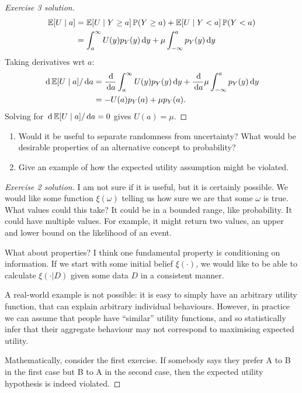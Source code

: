 \documentclass[twoside,a4paper]{article}
\begin{document}
\begin{proof}[Exercise 3 solution]
\begin{align*}
    \mathop{\mbox{\ensuremath{\mathbb{E}}}}\nolimits[U \mid a]
    &=
      \mathop{\mbox{\ensuremath{\mathbb{E}}}}\nolimits[U \mid Y \geq a] \mathop{\mbox{\ensuremath{\mathbb{P}}}}\nolimits(Y \geq a)
      +
      \mathop{\mbox{\ensuremath{\mathbb{E}}}}\nolimits[U \mid Y < a] \mathop{\mbox{\ensuremath{\mathbb{P}}}}\nolimits(Y < a)
    \\
    &=
      \int_{a}^\infty U(y) p_Y(y) \, \mathrm{d} y
      +
      \mu \int_{-\infty}^a p_Y(y) \, \mathrm{d} y
  \end{align*}
  Taking derivatives wrt $a$:
  \begin{align*} 
    \, \mathrm{d} \mathop{\mbox{\ensuremath{\mathbb{E}}}}\nolimits[U \mid a]/\, \mathrm{d} a
    &=
      \frac{\, \mathrm{d}}{\, \mathrm{d} a} \int_{a}^\infty U(y) p_Y(y) \, \mathrm{d} y
      +
      \frac{\, \mathrm{d}}{\, \mathrm{d} a} \mu \int_{-\infty}^a p_Y(y) \, \mathrm{d} y
    \\
    &=
      - U(a) p_Y(a) 
      +
      \mu p_Y(a).
  \end{align*}
  Solving for $\, \mathrm{d} \mathop{\mbox{\ensuremath{\mathbb{E}}}}\nolimits[U \mid a]/\, \mathrm{d} a=0$ gives $U(a) = \mu$.
\end{proof}
\fi
\begin{exercise}
  \begin{enumerate}
    \item Would it be useful to separate randomness from uncertainty? What would be desirable properties of an alternative concept to probability?
  \item Give an example of how the expected utility assumption might be violated.
  \end{enumerate}
\end{exercise}
\if{}
\begin{proof}[Exercise 2 solution]
  I am not sure if it is useful, but it is certainly possible. We would like some function $\xi(\omega)$ telling us how sure we are that some $\omega$ is true. What values could this take? It could be in a bounded range, like probability. It could have multiple values. For example, it might return two values, an upper and lower bound on the likelihood of an event.


  What about properties? I think one fundamental property is conditioning on information. If we start with some initial belief $\xi(\cdot)$, we would like to be able to calculate $\xi(\cdot | D)$ given some data $D$ in a consistent manner.

  A real-world example is not possible: it is easy to simply have an arbitrary utility function, that can explain arbitrary individual behaviours. However, in practice we can assume that people have ``similar'' utility functions, and so statistically infer that their aggregate behaviour may not correspond to maximising expected utility.

  Mathematically, consider the first exercise. If somebody says they prefer A to B in the first case but B to A in the second case, then the expected utility hypothesis is indeed violated.
\end{proof}
\fi
\end{document}
